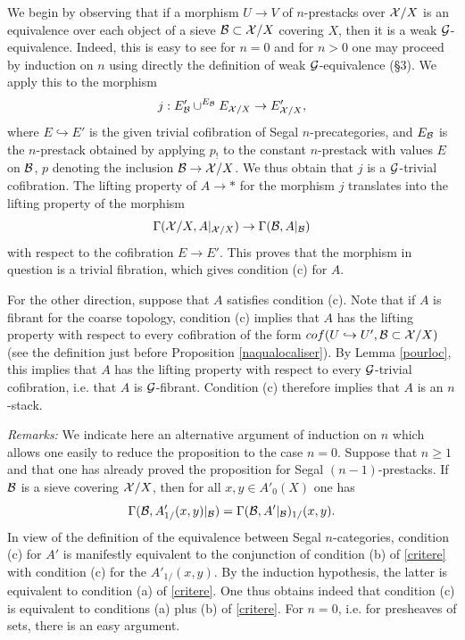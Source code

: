 We begin by observing that if a morphism $U\rightarrow V$ of $n$-prestacks over
${\cal X} /X$ is an equivalence over each object of a sieve ${\cal B} \subset {\cal X} /X$
covering $X$, then it is a weak ${\cal G}$-equivalence. Indeed, this is easy to see
for $n=0$ and for $n>0$ one may proceed by induction on $n$ using directly the
definition of weak ${\cal G}$-equivalence (\S 3). We apply this to the morphism
$$
j:E'_{{\cal B}} \cup ^{E_{{\cal B}}} E_{{\cal X} /X} \rightarrow E'_{{\cal X} /X},
$$
where $E\hookrightarrow E'$ is the given trivial cofibration of Segal
$n$-precategories, and $E_{{\cal B}}$ is the $n$-prestack obtained by applying $p_{!}$
to the constant $n$-prestack with values $E$ on ${\cal B}$, $p$ denoting the
inclusion ${\cal B} \rightarrow {\cal X} /X$. %
We thus obtain that $j$ is a ${\cal G}$-trivial cofibration. The lifting property of
$A\rightarrow \ast$ for the morphism $j$ translates into the lifting property
of the morphism
$$
\Gamma ({\cal X} /X, A|_{{\cal X} /X}) \rightarrow \Gamma ({\cal B} , A|_{{\cal B}})
$$
with respect to the cofibration $E\rightarrow E'$. This proves that the
morphism in question is a trivial fibration, which gives condition (c) for $A$.

For the other direction, suppose that $A$ satisfies condition (c).
Note that if $A$ is fibrant for the coarse topology, condition (c) implies that
$A$ has the lifting property with respect to every cofibration of the form
$cof(U\hookrightarrow U', {\cal B} \subset {\cal X} /X)$ (see the definition just before
Proposition \ref{naqualocaliser}). By Lemma \ref{pourloc}, this implies that
$A$ has the lifting property with respect to every ${\cal G}$-trivial cofibration,
i.e. that $A$ is ${\cal G}$-fibrant. Condition (c) therefore implies that $A$ is an
$n$-stack.
\eop


{\em Remarks:} We indicate here an alternative argument of induction on $n$
which allows one easily to reduce the proposition to the case $n=0$. Suppose
that $n\geq 1$ and that one has already proved the proposition for Segal
$(n-1)$-prestacks. If ${\cal B}$ is a sieve covering ${\cal X} /X$, then for all
$x,y\in A'_0(X)$ one has
$$
\Gamma ({\cal B}  , A'_{1/}(x,y)|_{{\cal B}})= \Gamma ({\cal B} , A'|_{{\cal B}})_{1/}(x,y).
$$
In view of the definition of the equivalence between Segal $n$-categories,
condition (c) for $A'$ is manifestly equivalent to the conjunction of condition
(b) of \ref{critere} with condition (c) for the $A'_{1/}(x,y)$. By the
induction hypothesis, the latter is equivalent to condition (a) of
\ref{critere}. One thus obtains indeed that condition (c) is equivalent to
conditions (a) plus (b) of \ref{critere}.
For $n=0$, i.e. for presheaves of sets, there is an easy argument.



